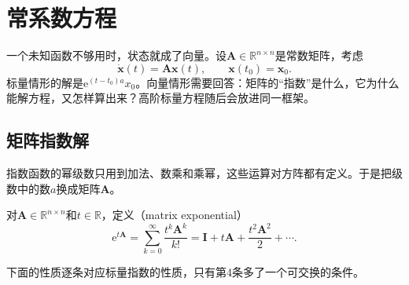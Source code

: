 \section{常系数方程}
\label{sec:lde-constant}

一个未知函数不够用时，状态就成了向量。设$\bm{A}\in\mathbb{R}^{n\times n}$是常数矩阵，考虑
\begin{equation}
 \dot{\bm{x}}(t)=\bm{A}\bm{x}(t),\qquad \bm{x}(t_0)=\bm{x}_0.
 \label{eq:lde-constant-system}
\end{equation}
标量情形的解是$\mathrm{e}^{(t-t_0)a}x_0$。向量情形需要回答：矩阵的“指数”是什么，它为什么能解方程，又怎样算出来？高阶标量方程随后会放进同一框架。

\subsection{矩阵指数解}
\label{sec:lde-matrix-exponential}

指数函数的幂级数只用到加法、数乘和乘幂，这些运算对方阵都有定义。于是把级数中的数$a$换成矩阵$\bm{A}$。

\begin{definition}[矩阵指数]
\label{def:lde-matrix-exponential}
对$\bm{A}\in\mathbb{R}^{n\times n}$和$t\in\mathbb{R}$，定义（matrix exponential）
\begin{equation}
 \mathrm{e}^{t\bm{A}}=\sum_{k=0}^{\infty}\frac{t^k\bm{A}^k}{k!}=\bm{I}+t\bm{A}+\frac{t^2\bm{A}^2}{2}+\cdots.
 \label{eq:lde-matrix-exponential}
\end{equation}
\end{definition}

下面的性质逐条对应标量指数的性质，只有第4条多了一个可交换的条件。

